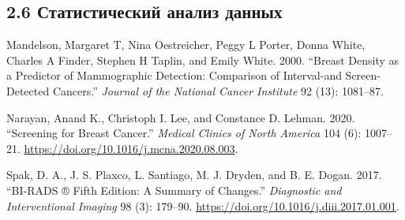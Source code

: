 \documentclass[
]{article}
\newlength{\cslhangindent}
\newlength{\cslentryspacingunit} %
\newenvironment{CSLReferences}[2] %
 {%
  \setlength{\parindent}{0pt}
  \ifodd #1
  \let\oldpar\par
  \def\par{\hangindent=\cslhangindent\oldpar}
  \fi
  \setlength{\parskip}{#2\cslentryspacingunit}
 }%
 {}
\begin{document}
\hypertarget{ux441ux442ux430ux442ux438ux441ux442ux438ux447ux435ux441ux43aux438ux439-ux430ux43dux430ux43bux438ux437-ux434ux430ux43dux43dux44bux445}{%
\subsection*{2.6 Статистический анализ
данных}\label{ux441ux442ux430ux442ux438ux441ux442ux438ux447ux435ux441ux43aux438ux439-ux430ux43dux430ux43bux438ux437-ux434ux430ux43dux43dux44bux445}}

\hypertarget{refs}{}
\begin{CSLReferences}{1}{0}
\leavevmode{}%
Mandelson, Margaret T, Nina Oestreicher, Peggy L Porter, Donna White,
Charles A Finder, Stephen H Taplin, and Emily White. 2000. {``Breast
Density as a Predictor of Mammographic Detection: Comparison of
Interval-and Screen-Detected Cancers.''} \emph{Journal of the National
Cancer Institute} 92 (13): 1081--87.

\leavevmode{}%
Narayan, Anand K., Christoph I. Lee, and Constance D. Lehman. 2020.
{``Screening for Breast Cancer.''} \emph{Medical Clinics of North
America} 104 (6): 1007--21.
\url{https://doi.org/10.1016/j.mcna.2020.08.003}.

\leavevmode{}%
Spak, D. A., J. S. Plaxco, L. Santiago, M. J. Dryden, and B. E. Dogan.
2017. {``BI-RADS ® Fifth Edition: A Summary of Changes.''}
\emph{Diagnostic and Interventional Imaging} 98 (3): 179--90.
\url{https://doi.org/10.1016/j.diii.2017.01.001}.

\end{CSLReferences}
\end{document}
